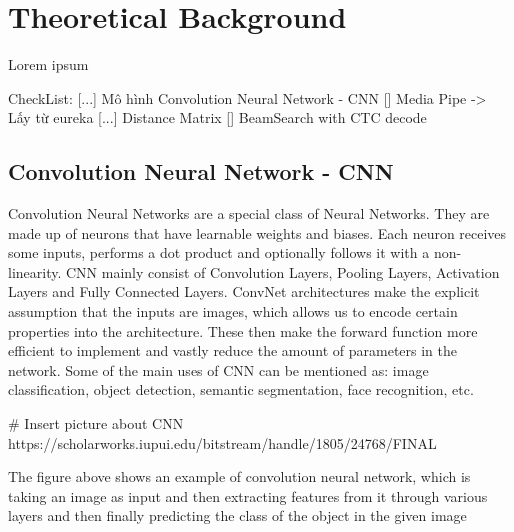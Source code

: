 \chapter{Theoretical Background}

Lorem ipsum

CheckList:
    [...] Mô hình Convolution Neural Network - CNN
    [] Media Pipe -> Lấy từ eureka
    [...] Distance Matrix
    [] BeamSearch with CTC decode

  \section{ Convolution Neural Network - CNN }
    Convolution Neural Networks are a special class of Neural Networks. They are made up 
    of neurons that have learnable weights and biases. Each neuron receives some inputs, 
    performs a dot product and optionally follows it with a non-linearity. CNN mainly consist
    of Convolution Layers, Pooling Layers, Activation Layers and Fully Connected Layers.
    ConvNet architectures make the explicit assumption that the inputs are images, 
    which allows us to encode certain properties into the architecture. These then 
    make the forward function more efficient to implement and vastly reduce the amount 
    of parameters in the network. Some of the main uses of CNN can be mentioned as: image
    classification, object detection, semantic segmentation, face recognition, etc.
    
    # Insert picture about CNN https://scholarworks.iupui.edu/bitstream/handle/1805/24768/FINAL%
    
      The figure above shows an example of convolution neural network, which is taking an image 
    as input and then extracting features from it through various layers and then finally predicting the
    class of the object in the given image

